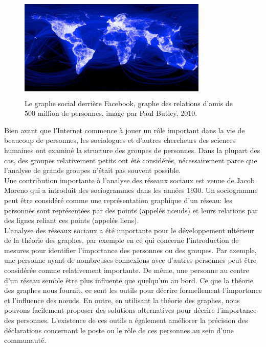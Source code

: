\begin{figure}[h!]
	\centering
	\includegraphics[width=9cm,height=5cm]{./figures/facebook}
	\caption{Le graphe social derrière Facebook, graphe des relations d'amis de $500$ million de personnes, image par 
		Paul Butley, $2010$.}
	\label{Facebook}
\end{figure}
Bien avant que l'Internet commence à jouer un rôle important dans la vie de beaucoup de personnes, les sociologues
et d'autres chercheurs des sciences humaines ont examiné la structure des groupes de personnes. Dans la plupart des
cas, des groupes relativement petits ont été considérés, nécessairement parce que l'analyse de grands groupes n'était
pas souvent possible.\\
Une contribution importante à l'analyse des réseaux sociaux est venue de Jacob Moreno qui a introduit des sociogrammes
dans les années $1930$. Un sociogramme peut être considéré comme une représentation graphique d'un réseau: les personnes
sont représentées par des points (appelés nœuds) et leurs relations par des lignes reliant ces points (appelés liens).\\
L'analyse des réseaux sociaux a été importante pour le développement ultérieur de la théorie des graphes, par exemple 
en ce qui concerne l'introduction de mesures pour identifier l'importance des personnes ou des groupes. Par exemple,
une personne ayant de nombreuses connexions avec d'autres personnes peut être considérée comme relativement importante.
De même, une personne au centre d'un réseau semble être plus influente que quelqu'un au bord. Ce que la théorie des 
graphes nous fournit, ce sont les outils pour décrire formellement l'importance et l'influence des nœuds. En outre, 
en utilisant la théorie des graphes, nous pouvons facilement proposer des solutions alternatives pour décrire 
l'importance des personnes. L'existence de ces outils a également améliorer la précision des déclarations concernant
le poste ou le rôle de ces personnes au sein d'une communauté.
